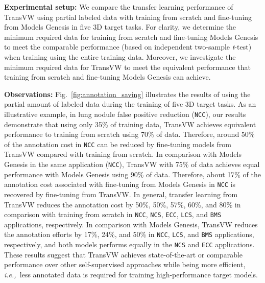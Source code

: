 \documentclass[journal,twoside,web]{ieeecolor}
\def\figurename{Fig.}
\newcommand{\ie}{\mbox{\emph{i.e.,\ }}}
\begin{document}
\smallskip
\noindent\textbf{Experimental setup:} We compare the transfer learning performance of TransVW using partial labeled data with training from scratch and fine-tuning from  Models Genesis in five 3D target tasks. For clarity, we determine the minimum required data for training from scratch and fine-tuning Models Genesis to meet the comparable performance (based on independent two-sample \textit{t}-test) when  training using  the entire training data. Moreover, we investigate the minimum required data for TransVW to meet the equivalent performance that  training from scratch and fine-tuning Models Genesis can achieve.

\smallskip
\noindent\textbf{Observations:}
\figurename~\ref{fig:annotation_saving} illustrates the results of using the partial amount of labeled data during the training of five 3D target tasks. As an illustrative example, in lung nodule false positive reduction (\texttt{NCC}), our results demonstrate that using only 35\% of training data, TransVW achieves equivalent performance to training from scratch using 70\% of data. Therefore, around 50\% of the annotation cost in \texttt{NCC} can be reduced by fine-tuning models from TransVW compared with training from scratch. In comparison with Models Genesis in the same application (\texttt{NCC}), TransVW with 75\% of data achieves equal performance with Models Genesis using 90\% of data. Therefore, about 17\% of the annotation cost associated with fine-tuning from Models Genesis in \texttt{NCC} is recovered by fine-tuning from TransVW. In general, transfer learning from TransVW reduces the annotation cost by 50\%, 50\%, 57\%, 60\%, and 80\% in comparison with training from scratch in \texttt{NCC}, \texttt{NCS}, \texttt{ECC}, \texttt{LCS}, and \texttt{BMS} applications, respectively. In comparison with Models Genesis, TransVW reduces the annotation efforts by 17\%, 24\%, and 50\% in \texttt{NCC}, \texttt{LCS}, and \texttt{BMS} applications, respectively, and both models performs equally in the \texttt{NCS} and \texttt{ECC} applications. 
These results suggest that TransVW achieves state-of-the-art or comparable performance over other self-supervised  approaches while being  more efficient, \ie less annotated data is required for training high-performance target models.
 
 
\end{document}
